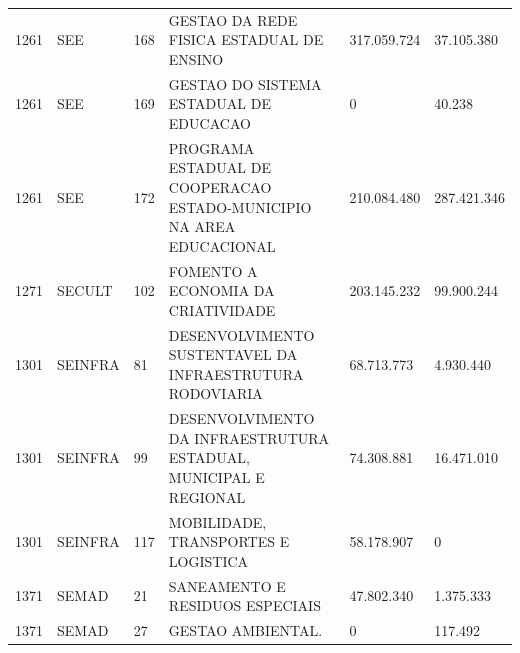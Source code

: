 \documentclass{article}
\begin{document}
\begin{longtable}[c]{m{1cm}|m{1.5cm}|m{1cm}m{8cm}|m{2cm}m{2cm}}
\multicolumn{1}{C{1cm}|}{1261} & \multicolumn{1}{L{1.5cm}|}{SEE} & \multicolumn{1}{C{1cm}|}{168} & \multicolumn{1}{L{8cm}|}{GESTAO DA REDE FISICA ESTADUAL DE ENSINO} & \multicolumn{1}{R{2cm}|}{317.059.724} & \multicolumn{1}{R{2cm}}{37.105.380} \\
\multicolumn{1}{C{1cm}|}{1261} & \multicolumn{1}{L{1.5cm}|}{SEE} & \multicolumn{1}{C{1cm}|}{169} & \multicolumn{1}{L{8cm}|}{GESTAO DO SISTEMA ESTADUAL DE EDUCACAO} & \multicolumn{1}{R{2cm}|}{            0} & \multicolumn{1}{R{2cm}}{40.238} \\
\multicolumn{1}{C{1cm}|}{1261} & \multicolumn{1}{L{1.5cm}|}{SEE} & \multicolumn{1}{C{1cm}|}{172} & \multicolumn{1}{L{8cm}|}{PROGRAMA ESTADUAL DE COOPERACAO ESTADO-MUNICIPIO NA AREA EDUCACIONAL} & \multicolumn{1}{R{2cm}|}{210.084.480} & \multicolumn{1}{R{2cm}}{287.421.346} \\
\multicolumn{1}{C{1cm}|}{1271} & \multicolumn{1}{L{1.5cm}|}{SECULT} & \multicolumn{1}{C{1cm}|}{102} & \multicolumn{1}{L{8cm}|}{FOMENTO A ECONOMIA DA CRIATIVIDADE} & \multicolumn{1}{R{2cm}|}{203.145.232} & \multicolumn{1}{R{2cm}}{99.900.244} \\
\multicolumn{1}{C{1cm}|}{1301} & \multicolumn{1}{L{1.5cm}|}{SEINFRA} & \multicolumn{1}{C{1cm}|}{81} & \multicolumn{1}{L{8cm}|}{DESENVOLVIMENTO SUSTENTAVEL DA INFRAESTRUTURA RODOVIARIA} & \multicolumn{1}{R{2cm}|}{68.713.773} & \multicolumn{1}{R{2cm}}{4.930.440} \\
\multicolumn{1}{C{1cm}|}{1301} & \multicolumn{1}{L{1.5cm}|}{SEINFRA} & \multicolumn{1}{C{1cm}|}{99} & \multicolumn{1}{L{8cm}|}{DESENVOLVIMENTO DA INFRAESTRUTURA ESTADUAL, MUNICIPAL E REGIONAL} & \multicolumn{1}{R{2cm}|}{74.308.881} & \multicolumn{1}{R{2cm}}{16.471.010} \\
\multicolumn{1}{C{1cm}|}{1301} & \multicolumn{1}{L{1.5cm}|}{SEINFRA} & \multicolumn{1}{C{1cm}|}{117} & \multicolumn{1}{L{8cm}|}{MOBILIDADE, TRANSPORTES E LOGISTICA} & \multicolumn{1}{R{2cm}|}{58.178.907} & \multicolumn{1}{R{2cm}}{            0} \\
\multicolumn{1}{C{1cm}|}{1371} & \multicolumn{1}{L{1.5cm}|}{SEMAD} & \multicolumn{1}{C{1cm}|}{21} & \multicolumn{1}{L{8cm}|}{SANEAMENTO E RESIDUOS ESPECIAIS} & \multicolumn{1}{R{2cm}|}{47.802.340} & \multicolumn{1}{R{2cm}}{1.375.333} \\
\multicolumn{1}{C{1cm}|}{1371} & \multicolumn{1}{L{1.5cm}|}{SEMAD} & \multicolumn{1}{C{1cm}|}{27} & \multicolumn{1}{L{8cm}|}{GESTAO AMBIENTAL.} & \multicolumn{1}{R{2cm}|}{            0} & \multicolumn{1}{R{2cm}}{117.492} \\

\end{longtable}
\end{document}
